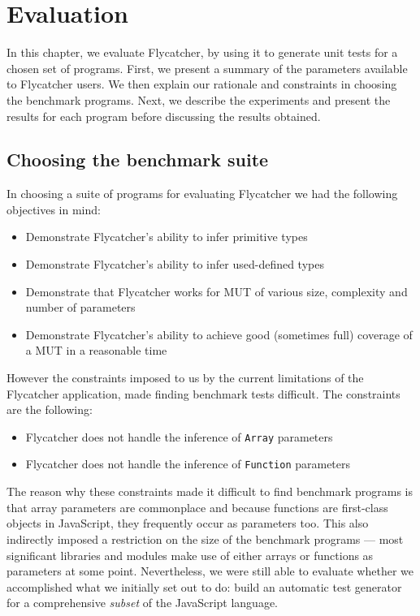 \chapter{Evaluation}
In this chapter, we evaluate \textsf{Flycatcher}, by using it to generate unit tests for a chosen set of programs. First, we present a summary of the parameters available to \textsf{Flycatcher} users. We then explain our rationale and constraints in choosing the benchmark programs. Next, we describe the experiments and present the results for each program before discussing the results obtained.

\section{Choosing the benchmark suite}
In choosing a suite of programs for evaluating \textsf{Flycatcher} we had the following objectives in mind:

\begin{itemize}
   \item Demonstrate \textsf{Flycatcher}'s ability to infer primitive types
   \item Demonstrate \textsf{Flycatcher}'s ability to infer used-defined types
   \item Demonstrate that \textsf{Flycatcher} works for MUT of various size, complexity and number of parameters
   \item Demonstrate \textsf{Flycatcher}'s ability to achieve good (sometimes full) coverage of a MUT in a reasonable time
\end{itemize}

However the constraints imposed to us by the current limitations of the \textsf{Flycatcher} application, made finding benchmark tests difficult. The constraints are the following:

\begin{itemize}
   \item \textsf{Flycatcher} does not handle the inference of \texttt{Array} parameters
   \item \textsf{Flycatcher} does not handle the inference of \texttt{Function} parameters
\end{itemize}

The reason why these constraints made it difficult to find benchmark programs is that array parameters are commonplace and because functions are first-class objects in JavaScript, they frequently occur as parameters too. This also indirectly imposed a restriction on the size of the benchmark programs --- most significant libraries and modules make use of either arrays or functions as parameters at some point. Nevertheless, we were still able to evaluate whether we accomplished what we initially set out to do: build an automatic test generator for a comprehensive \emph{subset} of the JavaScript language.

